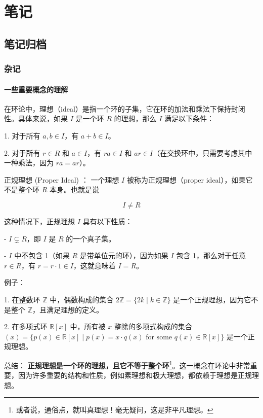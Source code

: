 \documentclass[lang=cn,12pt,fontset=none,a4paper]{beautybook}
\begin{document}
\thispagestyle{empty}
\tableofcontents\let\cleardoublepage\clearpage


\mainmatter
{}

\part{笔记}
\chapter{笔记归档}
\section{杂记}
\subsection{一些重要概念的理解}
在环论中，理想（ideal）是指一个环的子集，它在环的加法和乘法下保持封闭性。具体来说，如果 $I$ 是一个环 $R$ 的理想，那么 $I$ 满足以下条件：

1. 对于所有 $a, b \in I$，有 $a + b \in I$。

2. 对于所有 $r \in R$ 和 $a \in I$，有 $ra \in I$ 和 $ar \in I$（在交换环中，只需要考虑其中一种乘法，因为 $ra = ar$）。

正规理想 (Proper Ideal) ：
一个理想 $I$ 被称为正规理想（proper ideal），如果它不是整个环 $R$ 本身。也就是说 %

\[ I \neq R \]

这种情况下，正规理想 $I$ 具有以下性质：

- $I \subsetneq R$，即 $I$ 是 $R$ 的一个真子集。

- $I$ 中不包含 1（如果 $R$ 是带单位元的环），因为如果 $I$ 包含 1，那么对于任意 $r \in R$，有 $r = r \cdot 1 \in I$，这就意味着 $I = R$。

例子：

1. 在整数环 $\mathbb{Z}$ 中，偶数构成的集合 $2\mathbb{Z} = \{2k \mid k \in \mathbb{Z}\}$ 是一个正规理想，因为它不是整个 $\mathbb{Z}$，且满足理想的定义。

2. 在多项式环 $\mathbb{R}[x]$ 中，所有被 $x$ 整除的多项式构成的集合 $(x) = \{ p(x) \in \mathbb{R}[x] \mid p(x) = x \cdot q(x) \text{ for some } q(x) \in \mathbb{R}[x] \}$ 是一个正规理想。

总结：
\textbf{正规理想是一个环的理想，且它不等于整个环}\footnote{或者说，通俗点，就叫真理想！毫无疑问，这是非平凡理想。}。这一概念在环论中非常重要，因为许多重要的结构和性质，例如素理想和极大理想，都依赖于理想是正规理想。
\end{document}
